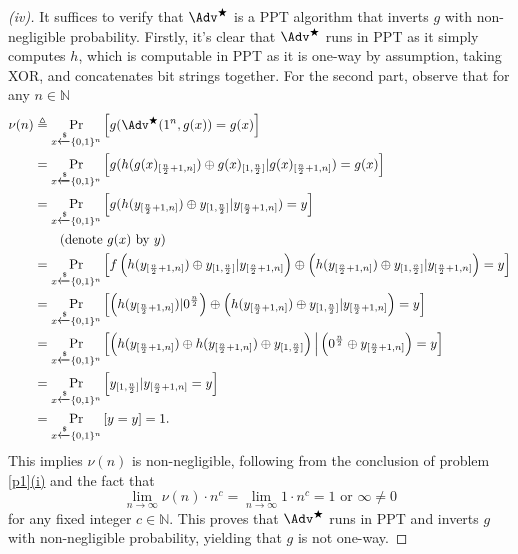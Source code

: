 \begin{proof}[(iv)]
    It suffices to verify that $\Adv^\bigstar$ is a PPT algorithm that inverts $g$ with non-negligible probability. Firstly, it's clear that $\Adv^\bigstar$ runs in PPT as it simply computes $h$, which is computable in PPT as it is one-way by assumption, taking XOR, and concatenates bit strings together. For the second part, observe that for any $n\in\mathbb{N}$
    \begin{align*}
        \nu(n)&\triangleq \Pr_{x\xleftarrow{\$}\{0,1\}^n}\left[g(\Adv^\bigstar(1^n, g(x)) = g(x)\right]\\
        &= \Pr_{x\xleftarrow{\$}\{0,1\}^n}\left[g(h(g(x)_{[\frac{n}{2}+1, n]})\oplus g(x)_{[1,\frac{n}{2}]}|g(x)_{[\frac{n}{2}+1, n]}) = g(x)\right]\\
        &= \Pr_{x\xleftarrow{\$}\{0,1\}^n}\left[g(h(y_{[\frac{n}{2}+1, n]})\oplus y_{[1,\frac{n}{2}]}|y_{[\frac{n}{2}+1, n]}) = y\right]\\
        &\qquad (\text{denote } g(x) \text{ by } y)\\
        &= \Pr_{x\xleftarrow{\$}\{0,1\}^n}\left[f\left(h(y_{[\frac{n}{2}+1, n]})\oplus y_{[1,\frac{n}{2}]}|y_{[\frac{n}{2}+1, n]}\right)\oplus \left(h(y_{[\frac{n}{2}+1, n]})\oplus y_{[1,\frac{n}{2}]}|y_{[\frac{n}{2}+1, n]}\right) = y\right]\\
        &= \Pr_{x\xleftarrow{\$}\{0,1\}^n}\left[\left(h(y_{[\frac{n}{2}+1, n]}) | 0^{\frac{n}{2}}\right)\oplus \left(h(y_{[\frac{n}{2}+1, n]})\oplus y_{[1,\frac{n}{2}]}|y_{[\frac{n}{2}+1, n]}\right) = y\right]\\
        &= \Pr_{x\xleftarrow{\$}\{0,1\}^n}\left[\left(h(y_{[\frac{n}{2}+1, n]}) \oplus h(y_{[\frac{n}{2}+1, n]})\oplus y_{[1,\frac{n}{2}]}\right) \Big| \left( 0^{\frac{n}{2}} \oplus y_{[\frac{n}{2}+1, n]}\right) = y\right]\\
        &= \Pr_{x\xleftarrow{\$}\{0,1\}^n}\left[y_{[1,\frac{n}{2}]} | y_{[\frac{n}{2}+1, n]}= y\right]\\
        &= \Pr_{x\xleftarrow{\$}\{0,1\}^n}\left[y = y\right] =1.
    \end{align*}
    This implies $\nu(n)$ is non-negligible, following from the conclusion of problem \ref{p1}\hyperref[pf:1-i]{(i)} and the fact that\
    \[
    \lim\limits_{n\to\infty}\nu(n)\cdot n^c
    =\lim\limits_{n\to\infty} 1\cdot n^c = 1\text{ or }\infty \neq 0
    \] 
    for any fixed integer $c\in\mathbb{N}$. This proves that $\Adv^\bigstar$ runs in PPT and inverts $g$ with non-negligible probability, yielding that $g$ is not one-way.
\end{proof}






